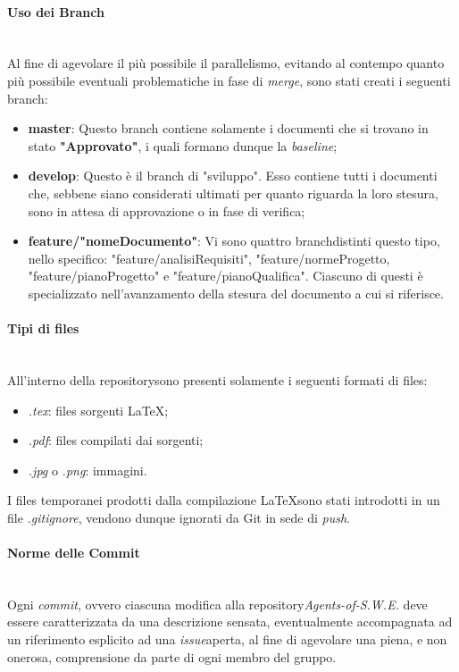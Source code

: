 \paragraph{Uso dei Branch} ~\\
	Al fine di agevolare il più possibile il parallelismo, evitando al contempo quanto più possibile eventuali problematiche in fase di \textit{merge}\glossario, sono stati creati i seguenti branch\glossario:
	\begin{itemize}
	\item \textbf{master}: Questo branch contiene solamente i documenti che si trovano in stato \textbf{"Approvato"}, i quali formano dunque la \textit{baseline}\glossario;
	\item \textbf{develop}: Questo è il branch di "sviluppo". Esso contiene tutti i documenti che, sebbene siano considerati ultimati per quanto riguarda la loro stesura, sono in attesa di approvazione o in fase di verifica;
	\item \textbf{feature/"nomeDocumento"}: Vi sono quattro branch\glossario distinti questo tipo, nello specifico: "feature/analisiRequisiti", "feature/normeProgetto, "feature/pianoProgetto" e "feature/pianoQualifica". Ciascuno di questi è specializzato nell'avanzamento della stesura del documento a cui si riferisce.
	\end{itemize}

\paragraph{Tipi di files} ~\\
	All'interno della repository\glossario sono presenti solamente i seguenti formati di files:
	\begin{itemize}
	\item \textit{.tex}: files sorgenti LaTeX\glossario;
	\item \textit{.pdf}: files compilati dai sorgenti;
	\item \textit{.jpg} o \textit{.png}: immagini.
	\end{itemize}
	I files temporanei prodotti dalla compilazione LaTeX\glossario sono stati introdotti in un file \textit{.gitignore}, vendono dunque ignorati da Git in sede di \textit{push}\glossario.

\paragraph{Norme delle Commit} ~\\
	Ogni \textit{commit}\glossario, ovvero ciascuna modifica alla repository\glossario \textit{Agents-of-S.W.E.} deve essere caratterizzata da una descrizione sensata, eventualmente accompagnata ad un riferimento esplicito ad una \textit{issue}\glossario aperta, al fine di agevolare una piena, e non onerosa, comprensione da parte di ogni membro del gruppo.

